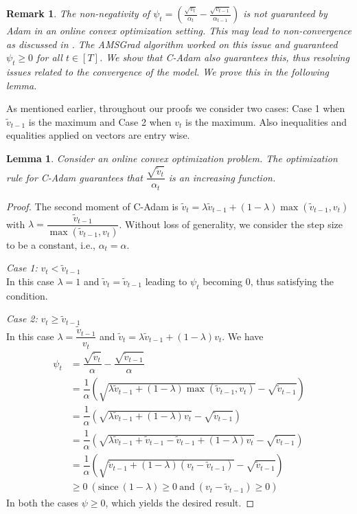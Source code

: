 \documentclass[12pt]{article}
\newtheorem{lem}[thm]{Lemma}%
\newtheorem{rem}[thm]{Remark}%
\begin{document}
\begin{rem}
The non-negativity of 
    $\displaystyle \psi_{t} = \left( \frac{\sqrt{v_{t}}}{\alpha_{t}} - \frac{\sqrt{v_{t-1}}}{\alpha_{t-1}} \right)$
    is not guaranteed by Adam in an online convex optimization setting. This may lead to non-convergence as discussed in \cite{ReddiKaleKumar2019}. The AMSGrad algorithm worked on this issue and guaranteed $\psi_t \geq 0$ for all $t\in [T]$. We show that C-Adam also guarantees this, thus resolving issues related to the convergence of the model. We prove this in the following lemma. 
\end{rem} 

As mentioned earlier, throughout our proofs we consider two cases: Case 1 when $\tilde{v}_{t-1}$ is the maximum and Case 2 when $v_t$ is the maximum. Also inequalities and equalities applied on vectors are entry wise.
\begin{lem}
    Consider an online convex optimization problem. The optimization rule for C-Adam guarantees that $ \dfrac{\sqrt{\tilde{v}_{t}}}{\alpha_{t}}$ is an increasing function.
\end{lem}
\begin{proof}
    The second moment of C-Adam is $\tilde{v}_{t} = \lambda\tilde{v}_{t-1} + (1-\lambda)\max(\tilde{v}_{t-1}, v_{t})$ with $\lambda = \dfrac{\tilde{v}_{t-1}}{\max(\tilde{v}_{t-1}, v_{t})}$. Without loss of generality, we consider the step size to be a constant, i.e., $\alpha_t = \alpha$.

    \textit{Case 1:} $v_{t} < \tilde{v}_{t-1}$\\
In this case $\lambda = 1$ and $\tilde{v}_{t} = \tilde{v}_{t-1}$ leading to $\psi_t$ becoming 0, thus satisfying the condition.

\textit{Case 2:} $v_{t} \geq \tilde{v}_{t-1}$\\
In this case $\lambda = \dfrac{\tilde{v}_{t-1}}{v_{t}}$ and $\tilde{v}_{t} = \lambda\tilde{v}_{t-1} + (1-\lambda)v_{t}$. We have
\begin{align*}
\psi_{t} &= \dfrac{\sqrt{\tilde{v}_t}}{\alpha} - \dfrac{\sqrt{\tilde{v}_{t-1}}}{\alpha}\\
         &= \dfrac{1}{\alpha}(\sqrt{\lambda\tilde{v}_{t-1} + (1-\lambda)\max(\tilde{v}_{t-1}, v_{t})} -  \sqrt{\tilde{v}_{t-1}})\\ 
         &= \dfrac{1}{\alpha}(\sqrt{\lambda\tilde{v}_{t-1} + (1-\lambda)v_{t}} -  \sqrt{\tilde{v}_{t-1}})\\
        &= \dfrac{1}{\alpha}(\sqrt{\lambda\tilde{v}_{t-1} + \tilde{v}_{t-1} - \tilde{v}_{t-1} + (1-\lambda)v_{t}} -  \sqrt{\tilde{v}_{t-1}})\\
        &= \dfrac{1}{\alpha}(\sqrt{\tilde{v}_{t-1} + (1 - \lambda)(v_{t} - \tilde{v}_{t-1})} - \sqrt{\tilde{v}_{t-1}})\\
        &\geq 0 \ (\text{since}\ (1-\lambda)\geq 0\ \text{and}\ (v_t-\tilde{v}_{t-1})\geq 0)
\end{align*}
In both the cases $\psi \geq 0$, which yields the desired result.
\end{proof}
\end{document}
